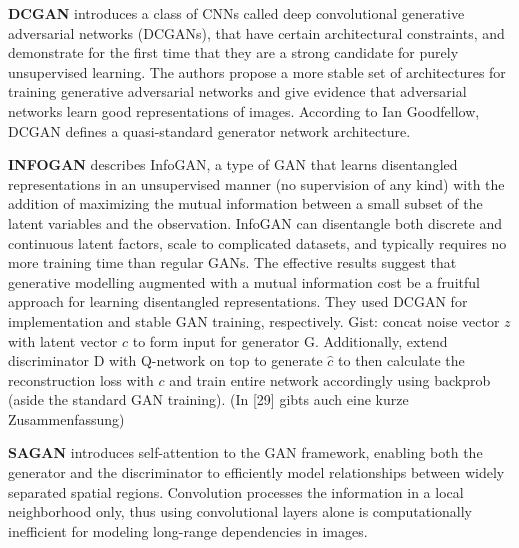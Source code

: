 \documentclass[11pt,a4paper]{article}
\begin{document}
\par \textbf{DCGAN} \cite{1511.06434} introduces a class of CNNs called deep convolutional generative adversarial networks (DCGANs), that have certain architectural constraints, and demonstrate for the first time that they are a strong candidate for purely unsupervised learning. The authors propose a more stable set of architectures for training generative adversarial networks and give evidence that adversarial networks learn good representations of images. According to Ian Goodfellow, DCGAN defines a quasi-standard generator network architecture. 

\par\textbf{INFOGAN} \cite{1606.03657} describes InfoGAN, a type of GAN that learns disentangled representations in an unsupervised manner (no supervision of any kind) with the addition of maximizing the mutual information between a small subset of the latent variables and the observation. InfoGAN can disentangle both discrete and continuous latent factors, scale to complicated datasets, and typically requires no more training time than regular GANs.  The effective results suggest that generative modelling augmented with a mutual information cost be a fruitful approach for learning disentangled representations. They used DCGAN for implementation and stable GAN training, respectively. Gist: concat noise vector $z$ with latent vector $c$ to form input for generator G. Additionally, extend discriminator D with Q-network on top to generate $\hat{c}$ to then calculate the reconstruction loss with $c$ and train entire network accordingly using backprob (aside the standard GAN training). (In [29] gibts auch eine kurze Zusammenfassung)

\par \textbf{SAGAN} \cite{1805.08318} introduces self-attention to the GAN framework, enabling both the generator and the discriminator to efficiently model relationships between widely separated spatial regions. Convolution processes the information in a local neighborhood only, thus using convolutional layers alone is computationally inefficient for modeling long-range dependencies in images.
\end{document}
